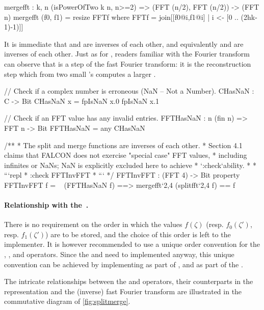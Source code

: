 \begin{code}
  mergefft : {k, n} (isPowerOfTwo k n, n>=2) =>
    (FFT (n/2), FFT (n/2)) -> (FFT n)
  mergefft (f0, f1) = resize FFTf where
    FFTf = join[[f0@i,f1@i] | i <- [0 .. (2^^(k-1)-1)]]
\end{code}

 It is immediate that \polsplit and \polmerge are inverses of each other, and equivalently \splitfft and \mergefft are inverses of each other. Just as for \splitfft, readers familiar with the Fourier transform can observe that \mergefft is a step of the fast Fourier transform: it is the reconstruction step which from two small \fft's computes a larger \fft.

\begin{code}
  // Check if a complex number is erroneous (NaN -- Not a Number).
  CHasNaN : C -> Bit
  CHasNaN x = fpIsNaN x.0 \/ fpIsNaN x.1

  // Check if an FFT value has any invalid entries.
  FFTHasNaN : {n} (fin n) => FFT n -> Bit
  FFTHasNaN = any CHasNaN

  /**
   * The split and merge functions are inverses of each other.
   * Section 4.1 claims that FALCON does not exercise "special case" FFT values,
   * including infinites or NaNs; NaN is explicitly excluded here to achieve
   * `:check`ability.
   *
   * ```repl
   * :check FFTInvFFT
   * ```
   */
  FFTInvFFT : (FFT 4) -> Bit
  property FFTInvFFT f = ~ (FFTHasNaN f) ==> mergefft`{2,4} (splitfft`{2,4} f) == f
\end{code}

 \paragraph{Relationship with the \fft.} There is no requirement on the order in which the values $f(\zeta)$ (resp. $f_0(\zeta')$, resp. $f_1(\zeta')$) are to be stored, and the choice of this order is left to the implementer. It is however recommended to use a unique order convention for the \fft, \ifft, \splitfft and \mergefft operators. Since the \fft and \ifft need to implemented anyway, this unique convention can be achieved \eg by implementing \splitfft as part of \ifft, and \mergefft as part of the \fft.


 The intricate relationships between the \polsplit and \polmerge operators, their counterparts in the \fft representation and the (inverse) fast Fourier transform are illustrated in the commutative diagram of \cref{fig:splitmerge}.

